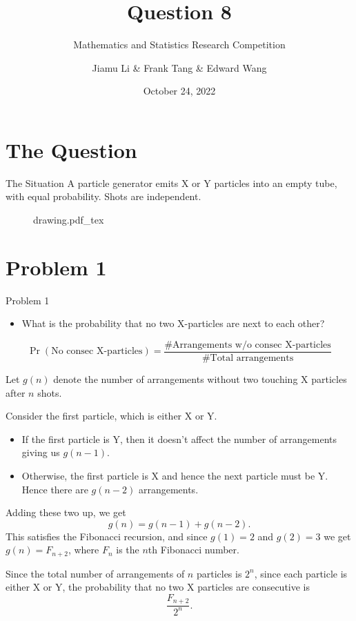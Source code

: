\documentclass[xcolor={usenames,dvipsnames}]{beamer}
\title{Question 8}
\subtitle{Mathematics and Statistics Research Competition}
\author{Jiamu Li \& Frank Tang \& Edward Wang}
\institute{Scotch College}
\date{October 24, 2022}
\DeclareMathOperator{\prob}{Pr}
\begin{document}
\begin{frame}
  \titlepage
\end{frame}


\section{The Question}
\begin{frame}{The Situation}
  A particle generator emits X or Y particles into an empty tube, with equal probability. Shots are independent.
  \vspace{1cm}
  \begin{center}
   \begin{figure}[ht]
    \centering
    \def\svgwidth{0.8\textwidth}
    {drawing.pdf_tex}
  \end{figure}
  \end{center}
\end{frame}
\section{Problem 1}
\begin{frame}{Problem 1}
\begin{itemize}
  \item What is the probability that no two X-particles are next to each other?
\end{itemize}

\begin{equation*}
  \prob(\text{No consec X-particles}) = \frac{\# \text{Arrangements w/o consec X-particles}}{\# \text{Total arrangements}}
\end{equation*}

\end{frame}

\begin{frame}
  Let $g(n)$ denote the number of arrangements without two touching X particles after  $n $ shots.
  
  Consider the first particle, which is either X or Y.
  \begin{itemize}
    \item If the first particle is Y, then it doesn't affect the number of arrangements giving us $g(n-1)$.
    \item Otherwise, the first particle is X and hence the next particle must be Y. Hence there are  $g(n-2)$ arrangements.
  \end{itemize}
\end{frame}
\begin{frame}
  Adding these two up, we get  \[
    g(n) = g(n-1) + g(n-2)
  .\] This satisfies the Fibonacci recursion, and since $g(1) = 2$ and $g(2) = 3$ we get $g(n) = F_{n+2}$, where $F_n$ is the $n$th Fibonacci number.

  Since the total number of arrangements of $n$ particles is $2^{n}$, since each particle is either X or Y, the probability that no two X particles are consecutive is \[
    \frac{F_{n+2}}{2^n}
  .\] 
\end{frame}
\end{document}

